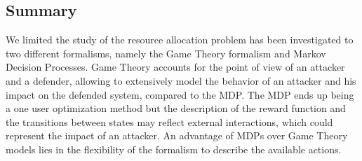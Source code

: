 
\subsection{Summary}
We limited the study of the resource allocation problem has been investigated to two different formalisms, namely the Game Theory formalism and Markov Decision Processes.
Game Theory accounts for the point of view of an attacker and a defender, allowing to extensively model the behavior of an attacker and his impact on the defended system, compared to the MDP.
The MDP ends up being a one user optimization method but the description of the reward function and the transitions between states may reflect external interactions, which could represent the impact of an attacker.
An advantage of MDPs over Game Theory models lies in the flexibility of the formalism to describe the available actions.

